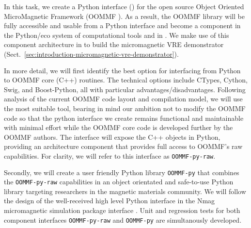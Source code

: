 \begin{workpackage}[id=component-architecture,wphases=0-48!.5,
  title=Component Architecture,lead=UV,
  PSRM=64,UVRM=8,SARM=16, USHRM=4, USORM=6, UORM=4, LLRM=22]
\begin{tasklist}
\begin{task}[lead=USO,id=oommf-python-interface,title=Python interface for OOMMF micromagnetic simulation library,PM=6,wphases=3-9,partners={SA}]
  In this task, we create a Python interface
  () for the open source Object
  Oriented MicroMagnetic Framework (OOMMF \cite{OOMMF-url}).
  As a result, the OOMMF library will be fully accessible and usable
  from a Python interface and become a component in the
  Python/\Jupyter eco system of computational tools and in
  \TheProject. We make use of this component architecture in
   to build the micromagnetic
  VRE demonstrator
  (Sect.~\ref{sec:introduction-micromagnetic-vre-demonstrator}).

  In more detail, we will first identify the best option for interfacing
  from Python to OOMMF core (C++) routines. The technical options
  include CTypes, Cython, Swig, and Boost-Python, all with particular
  advantages/disadvantages. Following analysis of the current OOMMF
  code layout and compilation model, we will use the most suitable
  tool, bearing in mind our ambition not to modify the OOMMF code so
  that the python interface we create remains functional and
  maintainable with minimal effort while the OOMMF core code is
  developed further by the OOMMF authors. 
  The interface will expose the C++ objects in Python, providing
  an architecture component that provides full access to OOMMF's
  raw capabilities. For clarity, we will refer to this interface as
  \texttt{OOMMF-py-raw}. %

  Secondly, we will create a user friendly Python library
  \texttt{OOMMF-py} that combines the \texttt{OOMMF-py-raw}
  capabilities in an object orientated and safe-to-use Python library
  targeting researchers in the magnetic materials community. We will
  follow the design of the well-received high level Python interface
  in the Nmag micromagnetic simulation package \cite{Fischbacher2007a}
  interface \cite{Nmag-url}. Unit and regression tests for both
  component interfaces \texttt{OOMMF-py-raw} and \texttt{OOMMF-py} are
  simultanously developed.


\end{task}
\end{tasklist}
\end{workpackage}
